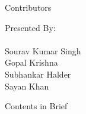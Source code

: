 \documentclass[10pt]{beamer}
\begin{document}
\begingroup
{}
	\begin{frame}[c]{Contributors}
		\begin{center}
			\Huge{Presented By:\\}
			\large{~\\Sourav Kumar Singh\\Gopal Krishna\\Subhankar Halder\\Sayan Khan\\}
		\end{center}
	\end{frame}
	\begin{frame}{Contents in Brief}
		\tableofcontents[hideallsubsections]
	\end{frame}
\endgroup

\begingroup
{}
	
\end{document}

